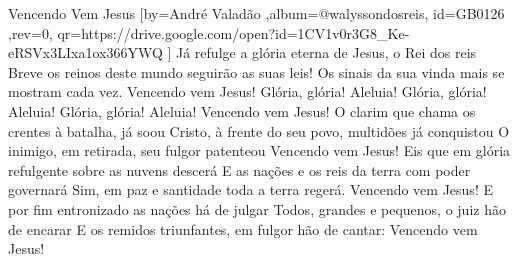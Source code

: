 \beginsong
{Vencendo Vem Jesus %
}[by={André Valadão %
},album={@walyssondosreis},
id={GB0126 %
},rev={0}, %
qr={https://drive.google.com/open?id=1CV1v0r3G8_Ke-eRSVx3LIxa1ox366YWQ %
}]
\beginverse*
Já refulge a glória eterna de Jesus, o Rei dos reis
Breve os reinos deste mundo seguirão as suas leis!
Os sinais da sua vinda mais se mostram cada vez.
Vencendo vem Jesus!
\endverse
\beginchorus
Glória, glória! Aleluia!
Glória, glória! Aleluia!
Glória, glória! Aleluia!
Vencendo vem Jesus!
\endchorus
\beginverse*
O clarim que chama os crentes à batalha, já soou
Cristo, à frente do seu povo, multidões já conquistou
O inimigo, em retirada, seu fulgor patenteou
Vencendo vem Jesus!
\endverse
\beginverse*
Eis que em glória refulgente sobre as nuvens descerá
E as nações e os reis da terra com poder governará
Sim, em paz e santidade toda a terra regerá.
Vencendo vem Jesus!
\endverse
\beginverse*
E por fim entronizado as nações há de julgar
Todos, grandes e pequenos, o juiz hão de encarar
E os remidos triunfantes, em fulgor hão de cantar:
Vencendo vem Jesus!
\endverse
\vspace{4em} %
\begin{comment}
\lstset{basicstyle=\scriptsize\bf} %
\tab{Solo 1}
\begin{lstlisting}
E|-----------------------------------------------------|
B|-----------------------------------------------------|
G|-----------------------------------------------------|
D|-----------------------------------------------------|
A|-----------------------------------------------------|
E|-----------------------------------------------------|
\end{lstlisting}
\end{comment}
 
